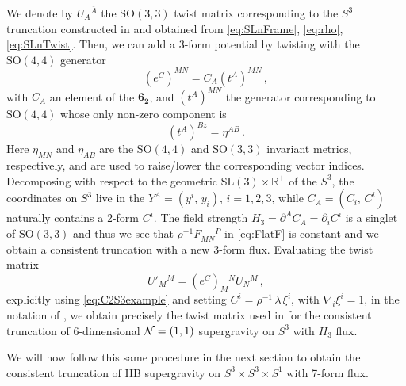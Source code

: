 \documentclass[a4paper, 11pt]{article}
\numberwithin{equation}{section}
\newcommand{\ov}[1]{\overline{#1}}
\newcommand{\SL}[1]{\mathrm{SL}( #1 )}
\newcommand{\SO}[1]{\mathrm{SO}( #1 )}
\newcommand{\+}{\oplus}
\newcommand{\EM}[1]{\textcolor{red}{#1}}
\begin{document}
We denote by $U_A{}^{\ov{A}}$ the $\SO{3,3}$ twist matrix corresponding to the $S^3$ truncation constructed in \cite{Lee:2014mla,Baguet:2015iou} and obtained from \eqref{eq:SLnFrame}, \eqref{eq:rho}, \eqref{eq:SLnTwist}. Then, we can add a 3-form potential by twisting with the $\SO{4,4}$ generator
\begin{equation} \label{eq:C2S3example}
	(e^C)^{MN} = C_A \left( t^A \right)^{MN} \,,
\end{equation}
with $C_A$ an element of the $\mathbf{6_{2}}$, and $\left( t^A \right)^{MN}$ the generator corresponding to $\SO{4,4}$ whose only non-zero component is
\begin{equation}
	\left(t^A\right)^{Bz} = \eta^{AB} \,.
\end{equation}
Here $\eta_{MN}$ and $\eta_{AB}$ are the $\SO{4,4}$ and $\SO{3,3}$ invariant metrics, respectively, and are used to raise/lower the corresponding vector indices. Decomposing with respect to the geometric $\SL{3} \times \mathbb{R}^+$ of the $S^3$,  the coordinates on $S^3$ live in the $Y^A = \left( y^i,\, y_i \right)$, $i = 1, 2, 3$, while $C_A = \left( C_i,\, C^i \right)$ naturally contains a 2-form $C^i$. The field strength $H_3 = \partial^A C_A = \partial_i C^i$ is a singlet of $\SO{3,3}$ and thus we see that $\rho^{-1} F_{\ov{M}\ov{N}}{}^{\ov{P}}$ in \eqref{eq:FlatF} is constant and we obtain a consistent truncation with a new 3-form flux. Evaluating the twist matrix
\begin{equation}
	U'_M{}^{\ov{M}} = (e^C)_M{}^N  U_N{}^{\ov{M}} \,,
\end{equation}
explicitly using \eqref{eq:C2S3example} and setting $C^i = \rho^{-1}\,\lambda\, \xi^i$, with $\nabla_i \xi^i = 1$, in the notation of \cite{Eloy:2021fhc}, we obtain precisely the twist matrix used in \cite{Eloy:2021fhc} for the consistent truncation of 6-dimensional ${\cal N}=(1,1)$ supergravity on $S^3$ with $H_3$ flux. %

We will now follow this same procedure in the next section to obtain the consistent truncation of IIB supergravity on $S^3 \times S^3 \times S^1$ with 7-form flux.
\end{document}
